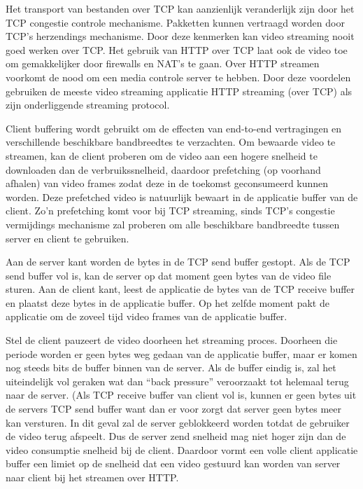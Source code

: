 \noindent Het transport van bestanden over TCP kan aanzienlijk veranderlijk zijn door het TCP congestie controle mechanisme. Pakketten kunnen vertraagd worden door TCP's herzendings mechanisme. Door deze kenmerken kan video streaming nooit goed werken over TCP.
Het gebruik van HTTP over TCP laat ook de video toe om gemakkelijker door firewalls en NAT's te gaan. Over HTTP streamen voorkomt de nood om een media controle server te hebben. Door deze voordelen gebruiken de meeste video streaming applicatie HTTP streaming (over TCP) als zijn onderliggende streaming protocol.


\noindent Client buffering wordt gebruikt om de effecten van end-to-end vertragingen en verschillende beschikbare bandbreedtes te verzachten. Om bewaarde video te streamen, kan de client proberen om de video aan een hogere snelheid te downloaden dan de verbruikssnelheid, daardoor prefetching (op voorhand afhalen) van video frames zodat deze in de toekomst geconsumeerd kunnen worden. Deze prefetched video is natuurlijk bewaart in de applicatie buffer van de client. Zo’n prefetching komt voor bij TCP streaming, sinds TCP’s congestie vermijdings mechanisme zal proberen om alle beschikbare bandbreedte tussen server en client te gebruiken.




\noindent Aan de server kant worden de bytes in de TCP send buffer gestopt. Als de TCP send buffer vol is, kan de server op dat moment geen bytes van de video file sturen.
Aan de client kant, leest de applicatie de bytes van de TCP receive buffer en plaatst deze bytes in de applicatie buffer. Op het zelfde moment pakt de applicatie om de zoveel tijd video frames van de applicatie buffer.

\noindent Stel de client pauzeert de video doorheen het streaming proces. Doorheen die periode worden er geen bytes weg gedaan van de applicatie buffer, maar er komen nog steeds bits de buffer binnen van de server. Als de buffer eindig is, zal het uiteindelijk vol geraken wat dan “back pressure” veroorzaakt tot helemaal terug naar de server. (Als TCP receive buffer van client vol is, kunnen er geen bytes uit de servers TCP send buffer want dan er voor zorgt dat server geen bytes meer kan versturen. In dit geval zal de server geblokkeerd worden totdat de gebruiker de video terug afspeelt.
Dus de server zend snelheid mag niet hoger zijn dan de video consumptie snelheid bij de client. Daardoor vormt een volle client applicatie buffer een limiet op de snelheid dat een video gestuurd kan worden van server naar client bij het streamen over HTTP.

